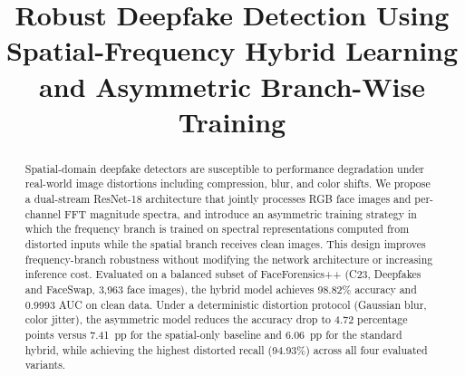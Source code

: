 \documentclass[conference]{IEEEtran}
\begin{document}
\title{Robust Deepfake Detection Using Spatial-Frequency Hybrid
Learning and Asymmetric Branch-Wise Training}

\author{
\and
{}
\and
{}
\and
{}
\and
{}
\and
{}
}

\maketitle

\begin{abstract}
Spatial-domain deepfake detectors are susceptible to performance
degradation under real-world image distortions including compression,
blur, and color shifts. We propose a dual-stream ResNet-18 architecture
that jointly processes RGB face images and per-channel FFT magnitude
spectra, and introduce an asymmetric training strategy in which the
frequency branch is trained on spectral representations computed from
distorted inputs while the spatial branch receives clean images. This
design improves frequency-branch robustness without modifying the
network architecture or increasing inference cost. Evaluated on a
balanced subset of FaceForensics++ (C23, Deepfakes and FaceSwap,
3,963 face images), the hybrid model achieves 98.82\% accuracy and
0.9993 AUC on clean data. Under a deterministic distortion protocol
(Gaussian blur, color jitter), the asymmetric model reduces the
accuracy drop to 4.72 percentage points versus 7.41~pp for the
spatial-only baseline and 6.06~pp for the standard hybrid, while
achieving the highest distorted recall (94.93\%) across all four
evaluated variants.
\end{abstract}
\end{document}
